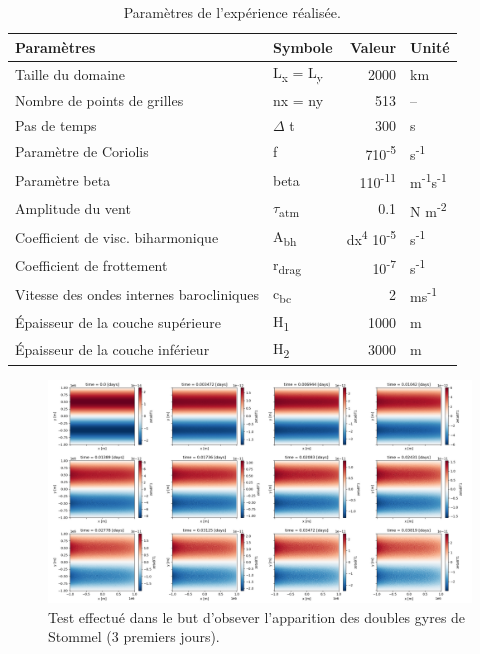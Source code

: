 \documentclass[10pt]{article}
\numberwithin{equation}{section}
\begin{document}
\begin{table}[htbp]
\caption{\label{tab:org190cc3f}Paramètres de l'expérience réalisée.}
\centering
\begin{tabular}{llrl}
\hline
\hline
Paramètres & Symbole & Valeur & Unité\\
\hline
Taille du domaine & L\textsubscript{x} = L\textsubscript{y} & 2000 & km\\
Nombre de points de grilles & nx = ny & 513 & --\\
Pas de temps & \(\Delta\) t & 300 & s\\
Paramètre de Coriolis & f & 7\texttimes{}10\textsuperscript{-5} & s\textsuperscript{-1}\\
Paramètre beta & beta & 1\texttimes{}10\textsuperscript{-11} & m\textsuperscript{-1}s\textsuperscript{-1}\\
Amplitude du vent & \(\tau\)\textsubscript{atm} & 0.1 & N m\textsuperscript{-2}\\
Coefficient de visc. biharmonique & A\textsubscript{bh} & dx\textsuperscript{4} \texttimes{}10\textsuperscript{-5} & s\textsuperscript{-1}\\
Coefficient de frottement & r\textsubscript{drag} & 10\textsuperscript{-7} & s\textsuperscript{-1}\\
Vitesse des ondes internes barocliniques & c\textsubscript{bc} & 2 & ms\textsuperscript{-1}\\
Épaisseur de la couche supérieure & H\textsubscript{1} & 1000 & m\\
Épaisseur de la couche inférieur & H\textsubscript{2} & 3000 & m\\
\hline
\end{tabular}
\end{table}


\begin{figure}[htbp]
\centering
\includegraphics[width=.9\linewidth]{figures/debuggage/2023_08_23_zetaBT_4filesperdays.png}
\caption{\label{fig:org6c48fe8}Test effectué dans le but d'obsever l'apparition des doubles gyres de Stommel (3 premiers jours).}
\end{figure}
\end{document}
